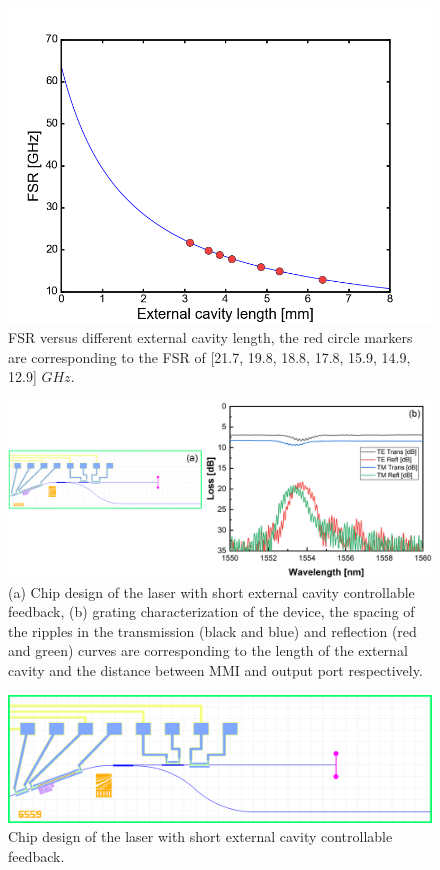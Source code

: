 \begin{figure}[ht]
    \centering
    \includegraphics[width=.55\linewidth]{figures/design_FSR.png}
    \caption{FSR versus different external cavity length, the red circle markers are corresponding to the FSR of [21.7, 19.8, 18.8, 17.8, 15.9, 14.9, 12.9] $GHz$.}
    \label{fig:design_FSR}
\end{figure}

\begin{figure}[ht]
    \centering
    \includegraphics[width=\linewidth]{figures/grating_6559.png}
    \caption{(a) Chip design of the laser with short external cavity controllable feedback, (b) grating characterization of the device, the spacing of the ripples in the transmission (black and blue) and reflection (red and green) curves are corresponding to the length of the external cavity and the distance between MMI and output port respectively.}
    \label{fig:grating_6559}
\end{figure}

\begin{figure}[ht]
    \centering
    \includegraphics[width=\linewidth]{figures/6559_short.png}
    \caption{Chip design of the laser with short external cavity controllable feedback.}
    \label{fig:grating_6559}
\end{figure}


